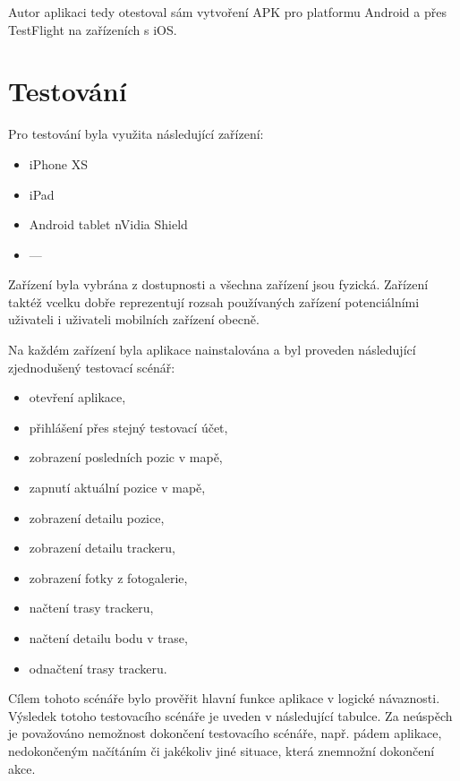 Autor aplikaci tedy otestoval sám vytvoření APK pro platformu Android a přes TestFlight na zařízeních s iOS.

\section{Testování}
Pro testování byla využita následující zařízení:
\begin{itemize}
	\item iPhone XS
	\item iPad
	\item Android tablet nVidia Shield
	\item ---
\end{itemize}

Zařízení byla vybrána z dostupnosti a všechna zařízení jsou fyzická. Zařízení taktéž vcelku dobře reprezentují rozsah používaných zařízení potenciálními uživateli i uživateli mobilních zařízení obecně.

Na každém zařízení byla aplikace nainstalována a byl proveden následující zjednodušený testovací scénář:

\begin{itemize}
	\item otevření aplikace,
	\item přihlášení přes stejný testovací účet,
	\item zobrazení posledních pozic v mapě,
	\item zapnutí aktuální pozice v mapě,
	\item zobrazení detailu pozice,
	\item zobrazení detailu trackeru,
	\item zobrazení fotky z fotogalerie,
	\item načtení trasy trackeru,
	\item načtení detailu bodu v trase,
	\item odnačtení trasy trackeru.
\end{itemize}

Cílem tohoto scénáře bylo prověřit hlavní funkce aplikace v logické návaznosti. Výsledek totoho testovacího scénáře je uveden v následující tabulce. Za neúspěch je považováno nemožnost dokončení testovacího scénáře, např. pádem aplikace, nedokončeným načítáním či jakékoliv jiné situace, která znemnožní dokončení akce.

